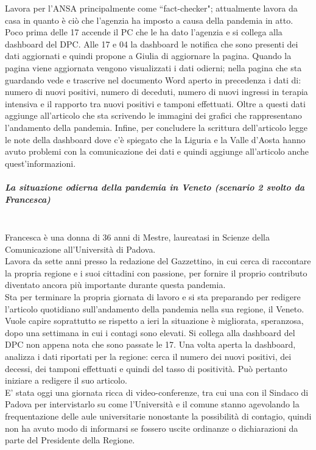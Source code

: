 Lavora per l'ANSA principalmente come ``fact-checker"; attualmente lavora da casa in quanto è ciò che l'agenzia ha imposto a causa della pandemia in atto.\\
Poco prima delle 17 accende il PC che le ha dato l'agenzia e si collega alla dashboard del DPC.
Alle 17 e 04 la dashboard le notifica che sono presenti dei dati aggiornati e quindi propone a Giulia di aggiornare la pagina.
Quando la pagina viene aggiornata vengono visualizzati i dati odierni; nella pagina che sta guardando vede e trascrive nel documento Word aperto in precedenza i dati di: numero di nuovi positivi, numero di deceduti, numero di nuovi ingressi in terapia intensiva e il rapporto tra nuovi positivi e tamponi effettuati.
Oltre a questi dati aggiunge all'articolo che sta scrivendo le immagini dei grafici che rappresentano l'andamento della pandemia.
Infine, per concludere la scrittura dell'articolo legge le note della dashboard dove c'è spiegato che la Liguria e la Valle d'Aosta hanno avuto problemi con la comunicazione dei dati e quindi aggiunge all'articolo anche quest'informazioni.
\noindent
\subparagraph{La situazione odierna della pandemia in Veneto (scenario 2 svolto da Francesca)}\mbox{}\\
Francesca è una donna di 36 anni di Mestre, laureatasi in Scienze della Comunicazione all'Università di Padova.\\
Lavora da sette anni presso la redazione del Gazzettino, in cui cerca di raccontare la propria regione e i suoi cittadini con passione, per fornire il proprio contributo diventato ancora più importante durante questa pandemia.\\
Sta per terminare la propria giornata di lavoro e si sta preparando per redigere l'articolo quotidiano sull'andamento della pandemia nella sua regione, il Veneto.\\
Vuole capire soprattutto se rispetto a ieri la situazione è migliorata, speranzosa, dopo una settimana in cui i contagi sono elevati. Si collega alla dashboard del DPC non appena nota che sono passate le 17.
Una volta aperta la dashboard, analizza i dati riportati per la regione: cerca il numero dei nuovi positivi, dei decessi, dei tamponi effettuati e quindi del tasso di positività. Può pertanto iniziare a redigere il suo articolo.\\
E' stata oggi una giornata ricca di video-conferenze, tra cui una con il Sindaco di Padova per intervistarlo su come l'Università e il comune stanno agevolando la frequentazione delle aule universitarie nonostante la possibilità di contagio, quindi non ha avuto modo di informarsi se fossero uscite ordinanze o dichiarazioni da parte del Presidente della Regione.
